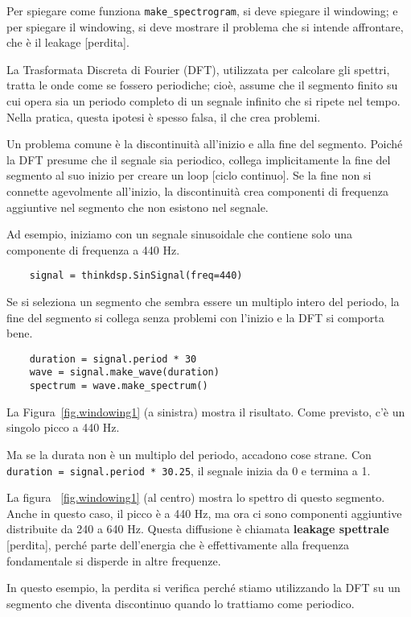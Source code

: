 \documentclass[12pt]{book} \usepackage[width=5.5in,height=8.5in, hmarginratio=3:2,vmarginratio=1:1]{geometry}
\begin{document}
Per spiegare come funziona \verb"make_spectrogram", si deve spiegare il windowing; e per spiegare il windowing, si deve mostrare il problema che si intende affrontare, che è il leakage [perdita].

La Trasformata Discreta di Fourier (DFT), utilizzata per calcolare gli spettri, tratta le onde come se fossero periodiche; cioè, assume che il segmento finito su cui opera sia un periodo completo di un segnale infinito che si ripete nel tempo. Nella pratica, questa ipotesi è spesso falsa, il che crea problemi.

Un problema comune è la discontinuità all'inizio e alla fine del segmento. Poiché la DFT presume che il segnale sia periodico, collega implicitamente la fine del segmento al suo inizio per creare un loop [ciclo continuo]. Se la fine non si connette agevolmente all'inizio, la discontinuità crea componenti di frequenza aggiuntive nel segmento che non esistono nel segnale.

Ad esempio, iniziamo con un segnale sinusoidale che contiene solo una componente di frequenza a 440 Hz.

\begin{verbatim} 
    signal = thinkdsp.SinSignal(freq=440)
 \end{verbatim} 

Se si seleziona un segmento che sembra essere un multiplo intero del periodo, la fine del segmento si collega senza problemi con l'inizio e la DFT si comporta bene.

\begin{verbatim} 
    duration = signal.period * 30
    wave = signal.make_wave(duration)
    spectrum = wave.make_spectrum()
 \end{verbatim} 

La Figura~\ref{fig.windowing1} (a sinistra) mostra il risultato. Come previsto, c'è un singolo picco a 440 Hz.

Ma se la durata non è un multiplo del periodo, accadono cose strane. Con {\tt duration = signal.period * 30.25}, il segnale inizia da 0 e termina a 1.

La figura ~\ref{fig.windowing1} (al centro) mostra lo spettro di questo segmento. Anche in questo caso, il picco è a 440 Hz, ma ora ci sono componenti aggiuntive distribuite da 240 a 640 Hz. Questa diffusione è chiamata {\bf leakage spettrale} [perdita], perché parte dell'energia che è effettivamente alla frequenza fondamentale si disperde in altre frequenze.

In questo esempio, la perdita si verifica perché stiamo utilizzando la DFT su un segmento che diventa discontinuo quando lo trattiamo come periodico.
\end{document}
